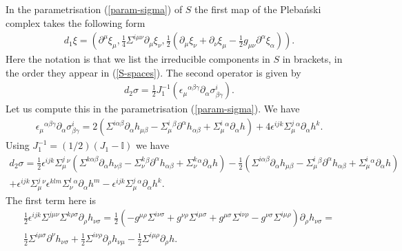 \documentclass[10pt]{report}
\newcommand{\pleb}[0]{Pleba\'nski}
\theoremstyle{definition}
\begin{document}
In the parametrisation (\ref{param-sigma}) of $S$ the first map of the \pleb{} complex takes the following form
\begin{align}
d_1 \xi = ( \partial^\mu \xi_\mu, \frac{1}{4} \Sigma^{i\mu\nu} \partial_\mu \xi_\nu, \frac{1}{2}( \partial_{\mu} \xi_{\nu}+ \partial_{\nu} \xi_{\mu}- \frac{1}{2} g_{\mu\nu} \partial^\alpha\xi_\alpha)).
\end{align}
Here the notation is that we list the irreducible components in $S$ in brackets, in the order they appear in (\ref{S-spaces}). The second operator is given by
\begin{align}
d_2 \sigma = \frac{1}{2} J_1^{-1}( \epsilon_\mu{}^{\alpha\beta\gamma} \partial_\alpha \sigma^i_{\beta\gamma}).
\end{align}
Let us compute this in the parametrisation (\ref{param-sigma}). We have
\begin{align}
\epsilon_\mu{}^{\alpha\beta\gamma} \partial_\alpha \sigma^i_{\beta\gamma} = 2 (\Sigma^{i\alpha\beta} \partial_\alpha h_{\mu\beta} - \Sigma^i_\mu{}^\beta \partial^\alpha h_{\alpha\beta} + \Sigma^i_\mu{}^\alpha \partial_\alpha h) + 4 \epsilon^{ijk} \Sigma^j_\mu{}^\alpha \partial_\alpha h^k.
\end{align}
Using $J_1^{-1} = (1/2)(J_1-\mathbb{I})$ we have
\begin{align}\nonumber
d_2 \sigma = \frac{1}{2} \epsilon^{ijk}\Sigma^j_\mu{}^\nu (\Sigma^{k\alpha\beta} \partial_\alpha h_{\nu\beta} - \Sigma^k_\nu{}^\beta \partial^\alpha h_{\alpha\beta} + \Sigma^k_\nu{}^\alpha \partial_\alpha h) - \frac{1}{2} (\Sigma^{i\alpha\beta} \partial_\alpha h_{\mu\beta} - \Sigma^i_\mu{}^\beta \partial^\alpha h_{\alpha\beta} + \Sigma^i_\mu{}^\alpha \partial_\alpha h)
\\ \nonumber 
+ \epsilon^{ijk}\Sigma^j_\mu{}^\nu \epsilon^{klm} \Sigma^l_\nu{}^\alpha \partial_\alpha h^m - \epsilon^{ijk} \Sigma^j_\mu{}^\alpha \partial_\alpha h^k.
\end{align}
The first term here is
\begin{align}
\frac{1}{2} \epsilon^{ijk}\Sigma^{j\mu\nu} \Sigma^{k\rho\sigma} \partial_\rho h_{\nu\sigma} = \frac{1}{2}  (- g^{\mu\rho} \Sigma^{i\nu\sigma} + g^{\nu\rho} \Sigma^{i\mu\sigma} + g^{\mu\sigma} \Sigma^{i\nu\rho} - g^{\nu\sigma} \Sigma^{i\mu\rho})  \partial_\rho h_{\nu\sigma}=\\ \nonumber
\frac{1}{2} \Sigma^{i\mu\sigma} \partial^\nu h_{\nu\sigma}+ \frac{1}{2} \Sigma^{i\nu\rho} \partial_\rho h_{\nu\mu} - \frac{1}{2} \Sigma^{i\mu\rho} \partial_\rho h.
\end{align}
\end{document}
